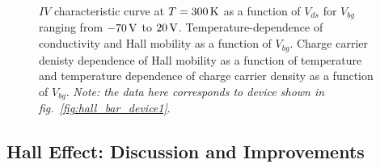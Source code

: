 \begin{figure}[ht]
	\qquad
	\caption[Output characteristics and channel properties of lightly $p$-doped  with 2D/2D contacts]{\protect{} $IV$ characteristic curve at $T=300\,\mathrm{K}$ as a function of $V_{ds}$ for $V_{bg}$ ranging from $-70\,\mathrm{V}$ to $20\,\mathrm{V}$. \protect{} Temperature-dependence of conductivity and \protect{} Hall mobility as a function of $V_{bg}$. \protect{} Charge carrier denisty dependence of Hall mobility as a function of temperature and \protect{} temperature dependence of charge carrier density as a function of $V_{bg}$. \emph{Note: the data here corresponds to device shown in fig.~\ref{fig:hall_bar_device1}}.}
	\label{fig:hall_measurement_data_lightly}
\end{figure}

\subsection{Hall Effect: Discussion and Improvements}\label{subsec:hall_improvements}

